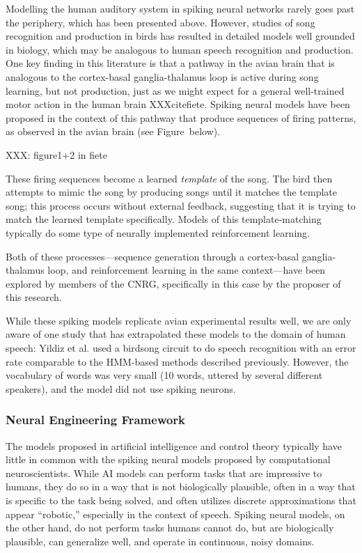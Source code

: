 \documentclass{article}
\begin{document}
Modelling the human auditory system
in spiking neural networks
rarely goes past the periphery,
which has been presented above.
However, studies of
song recognition and production
in birds has resulted in
detailed models well grounded
in biology, which may be analogous
to human speech recognition and production.
One key finding in this literature
is that a pathway in the avian brain
that is analogous to
the cortex-basal ganglia-thalamus loop
is active during song learning,
but not production,
just as we might expect
for a general well-trained motor action
in the human brain
XXXcitefiete.
Spiking neural models have been proposed
in the context of this pathway
that produce sequences of firing patterns,
as observed in the avian brain (see Figure~below).

XXX: figure1+2 in fiete

These firing sequences become
a learned \textit{template} of the song.
The bird then attempts to mimic the song
by producing songs until it matches
the template song;
this process occurs without
external feedback,
suggesting that it is trying
to match the learned template specifically.
Models of this template-matching
typically do some type of neurally
implemented reinforcement learning.

Both of these processes---sequence generation
through a cortex-basal ganglia-thalamus loop,
and reinforcement learning in the same context---have
been explored by members of the CNRG,
specifically in this case by
the proposer of this research.

While these spiking models
replicate avian experimental results well,
we are only aware of one study that
has extrapolated these models
to the domain of human speech:
Yildiz et al. used a birdsong
circuit to do speech recognition
with an error rate comparable
to the HMM-based methods described previously.
However, the vocabulary of words was very small
(10 words, uttered by several different speakers),
and the model did not use spiking neurons.

\subsubsection{Neural Engineering Framework}

The models proposed in
artificial intelligence and control theory typically
have little in common with the spiking neural models
proposed by computational neuroscientists.
While AI models
can perform tasks that are impressive to humans,
they do so in a way
that is not biologically plausible,
often in a way that is specific
to the task being solved,
and often utilizes discrete approximations
that appear ``robotic,'' especially
in the context of speech.
Spiking neural models,
on the other hand,
do not perform tasks humans cannot do,
but are biologically plausible,
can generalize well, and operate in
continuous, noisy domains.
\end{document}
